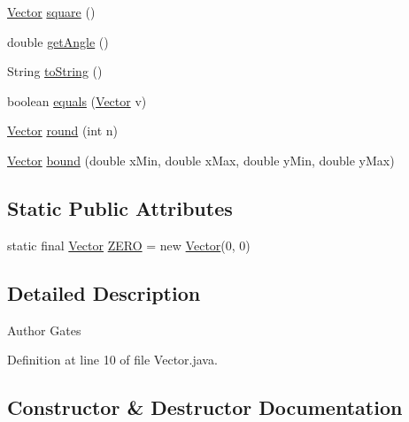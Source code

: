 \begin{DoxyCompactItemize}
\item 
\hyperlink{classmega_1_1boirlerplate_1_1_vector}{Vector} \hyperlink{classmega_1_1boirlerplate_1_1_vector_af5fc9e67442b69c1ca3c6a539923efa3}{square} ()
\item 
double \hyperlink{classmega_1_1boirlerplate_1_1_vector_a813b7771e479339445175c8d95f57d60}{get\+Angle} ()
\item 
String \hyperlink{classmega_1_1boirlerplate_1_1_vector_af6635de7cd12afcffc0bb1d54217c798}{to\+String} ()
\item 
boolean \hyperlink{classmega_1_1boirlerplate_1_1_vector_abf12419b6f33bb9153eb73c0d8589ae2}{equals} (\hyperlink{classmega_1_1boirlerplate_1_1_vector}{Vector} v)
\item 
\hyperlink{classmega_1_1boirlerplate_1_1_vector}{Vector} \hyperlink{classmega_1_1boirlerplate_1_1_vector_ae22004e952a4956f1d190b95cb82b6f8}{round} (int n)
\item 
\hyperlink{classmega_1_1boirlerplate_1_1_vector}{Vector} \hyperlink{classmega_1_1boirlerplate_1_1_vector_aa0e82d91a3e8435232a579a05652ddb1}{bound} (double x\+Min, double x\+Max, double y\+Min, double y\+Max)
\end{DoxyCompactItemize}
\subsection*{Static Public Attributes}
\begin{DoxyCompactItemize}
\item 
static final \hyperlink{classmega_1_1boirlerplate_1_1_vector}{Vector} \hyperlink{classmega_1_1boirlerplate_1_1_vector_ace091045275abf9589abee130d04aeb3}{Z\+E\+RO} = new \hyperlink{classmega_1_1boirlerplate_1_1_vector}{Vector}(0, 0)
\end{DoxyCompactItemize}


\subsection{Detailed Description}
\begin{DoxyAuthor}{Author}
Gates 
\end{DoxyAuthor}


Definition at line 10 of file Vector.\+java.



\subsection{Constructor \& Destructor Documentation}
\mbox{\label{classmega_1_1boirlerplate_1_1_vector_a56c8e60d529eca7ad150479c5341564c}} 
